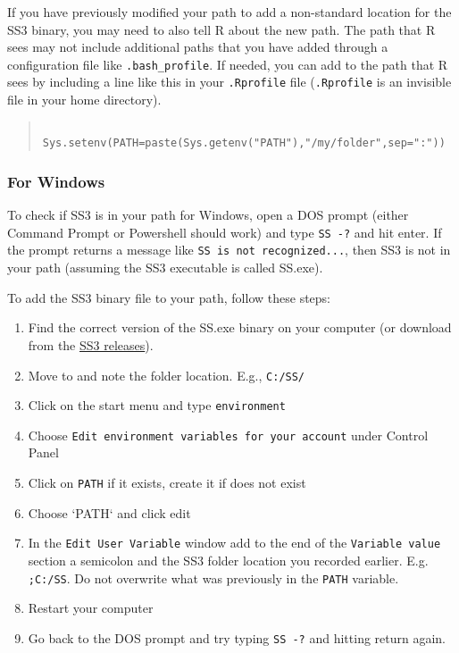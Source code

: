 If you have previously modified your path to add a non-standard location for the SS3 binary, you may need to also tell R about the new path. The path that R sees may not include additional paths that you have added through a configuration file like \texttt{.bash\_profile}. If needed, you can add to the path that R sees by including a line like this in your \texttt{.Rprofile} file (\texttt{.Rprofile} is an invisible file in your home directory).

\begin{quote}
   \begin{verbatim}
    Sys.setenv(PATH=paste(Sys.getenv("PATH"),"/my/folder",sep=":"))
    \end{verbatim}
\end{quote}

\subsubsection{For Windows}

To check if SS3 is in your path for Windows, open a DOS prompt (either Command Prompt or Powershell should work) and type \texttt{SS -?} and hit enter. If the prompt returns a message like \texttt{SS is not recognized...}, then SS3 is not in your path (assuming the SS3 executable is called SS.exe).

To add the SS3 binary file to your path, follow these steps:

\begin{enumerate}
  \item Find the correct version of the SS.exe binary on your computer (or download from the \href{https://github.com/nmfs-stock-synthesis/stock-synthesis/releases}{SS3 releases}).
  \item Move to and note the folder location. E.g., \texttt{C:/SS/}
  \item Click on the start menu and type \texttt{environment}
  \item Choose \texttt{Edit environment variables for your account} under Control Panel
  \item Click on \texttt{PATH} if it exists, create it if does not exist 
  \item Choose `PATH` and click edit
  \item In the \texttt{Edit User Variable} window add to the end of the \texttt{Variable value} section a semicolon and the SS3 folder location you recorded earlier.
     E.g. \texttt{;C:/SS}. Do not overwrite what was previously in the \texttt{PATH} variable.
  \item Restart your computer
  \item Go back to the DOS prompt and try typing \texttt{SS -?} and hitting return again.
\end{enumerate}


